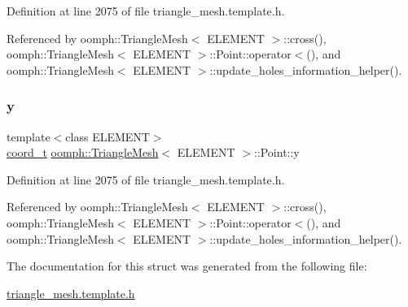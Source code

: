Definition at line 2075 of file triangle\+\_\+mesh.\+template.\+h.



Referenced by oomph\+::\+Triangle\+Mesh$<$ E\+L\+E\+M\+E\+N\+T $>$\+::cross(), oomph\+::\+Triangle\+Mesh$<$ E\+L\+E\+M\+E\+N\+T $>$\+::\+Point\+::operator$<$(), and oomph\+::\+Triangle\+Mesh$<$ E\+L\+E\+M\+E\+N\+T $>$\+::update\+\_\+holes\+\_\+information\+\_\+helper().

\mbox{\label{structoomph_1_1TriangleMesh_1_1Point_a0ce04810567f9e1cd9acf211073a35da}} 
\subsubsection{\texorpdfstring{y}{y}}
{\footnotesize\ttfamily template$<$class E\+L\+E\+M\+E\+NT$>$ \\
\hyperlink{classoomph_1_1TriangleMesh_ad50b14a66b40a3bfb22a43df86c9006e}{coord\+\_\+t} \hyperlink{classoomph_1_1TriangleMesh}{oomph\+::\+Triangle\+Mesh}$<$ E\+L\+E\+M\+E\+NT $>$\+::Point\+::y}



Definition at line 2075 of file triangle\+\_\+mesh.\+template.\+h.



Referenced by oomph\+::\+Triangle\+Mesh$<$ E\+L\+E\+M\+E\+N\+T $>$\+::cross(), oomph\+::\+Triangle\+Mesh$<$ E\+L\+E\+M\+E\+N\+T $>$\+::\+Point\+::operator$<$(), and oomph\+::\+Triangle\+Mesh$<$ E\+L\+E\+M\+E\+N\+T $>$\+::update\+\_\+holes\+\_\+information\+\_\+helper().



The documentation for this struct was generated from the following file\+:\begin{DoxyCompactItemize}
\item 
\hyperlink{triangle__mesh_8template_8h}{triangle\+\_\+mesh.\+template.\+h}\end{DoxyCompactItemize}
